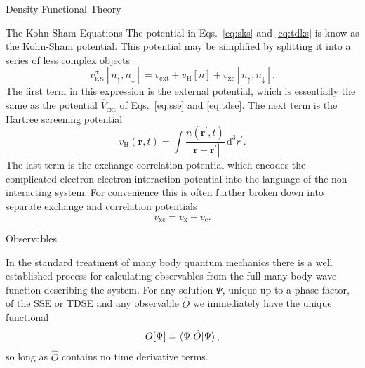 \documentclass[letterpaper, 12 pt]{report}
\begin{document}
\begin{chapter}{Density Functional Theory \label{chap:dft}}
\begin{section}{The Kohn-Sham Equations \label{sec:ks}}
      The potential in Eqs.\ \eqref{eq:sks} and \eqref{eq:tdks} is know as the Kohn-Sham potential. This
      potential may be simplified by splitting it into a series of less complex objects
      \begin{equation} \label{eq:vks}
         v^\sigma_\mathrm{KS}[n_\uparrow, n_\downarrow] = v_\mathrm{ext} + v_\mathrm{H}[n]
            + v_\mathrm{xc}[n_\uparrow, n_\downarrow].
      \end{equation}
      The first term in this expression is the external potential, which is essentially the same as the
      potential $\hat{V}_\mathrm{ext}$ of Eqs.\ \eqref{eq:sse} and \eqref{eq:tdse}. The next term is
      the Hartree screening potential
      \begin{equation} \label{eq:vh}
         v_\mathrm{H}(\mathbf{r},t) = \int \frac{n(\mathbf{r}^\prime, t)}
            {\left| \mathbf{r} - \mathbf{r}^\prime\right|} \, \mathrm{d}^3 r^\prime.
      \end{equation}
      The last term is the exchange-correlation potential which encodes the complicated
      electron-electron interaction potential into the language of the non-interacting system. For
      convenience this is often further broken down into separate exchange and correlation potentials
      \begin{equation} \label{eq:vxc}
         v_\mathrm{xc} = v_\mathrm{x} + v_\mathrm{c}.
      \end{equation}

   \end{section}

   \begin{section}{Observables \label{sec:obs}}

      In the standard treatment of many body quantum mechanics there is a well established process for
      calculating observables from the full many body wave function describing the system. For any
      solution $\Psi$, unique up to a phase factor, of the SSE or TDSE and any observable $\hat{O}$ we
      immediately have the unique functional
      \begin{equation} \label{eq:obsfunc1}
         O[\Psi] = \braket{\Psi| \hat{O} | \Psi},
      \end{equation}
      so long as $\hat{O}$ contains no time derivative terms.


\end{section}
\end{chapter}
\end{document}
